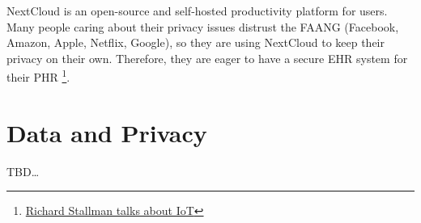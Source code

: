 NextCloud is an open-source and self-hosted productivity platform for users.
Many people caring about their privacy issues distrust the FAANG (Facebook,
Amazon, Apple, Netflix, Google), so they are using NextCloud to keep their privacy
on their own. Therefore, they are eager to have a secure EHR system for their
PHR
\footnote{\href{https://www.youtube.com/watch?v=AAP4N3KyLmM}{Richard Stallman talks about IoT}}.

\section{Data and Privacy}
TBD\dots
